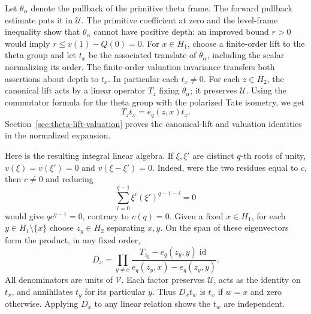 Let \(\theta_\alpha\) denote the pullback of the primitive theta
frame. The forward pullback estimate puts it in \(\mathcal U\).
The primitive coefficient at zero and the level-frame inequality
show that \(\theta_\alpha\) cannot have positive depth: an improved
bound \(r>0\) would imply \(r\le v(1)-Q(0)=0\).
For \(x\in H_1\), choose a finite-order lift to the theta group
and let \(t_x\) be the associated translate of \(\theta_\alpha\),
including the scalar normalizing its order. The finite-order
valuation invariance transfers both assertions about depth to \(t_x\).
In particular each \(t_x\ne0\). For each \(z\in H_2\), the canonical
lift acts by a linear operator \(T_z\) fixing \(\theta_\alpha\);
it preserves \(\mathcal U\).
Using the commutator formula for the theta group with the polarized
Tate isometry, we get
\[
                    T_z t_x=e_q(z,x)t_x .
\]
Section~\ref{sec:theta-lift-valuation} proves the canonical-lift and
valuation identities in the normalized expansion.

Here is the resulting integral linear algebra. If \(\xi,\xi'\) are
distinct \(q\)-th roots of unity, \(v(\xi)=v(\xi')=0\) and
\(v(\xi-\xi')=0\). Indeed, were the two residues equal to \(c\), then
\(c\ne0\) and reducing
\[
          \sum_{i=0}^{q-1}\xi^i(\xi')^{q-1-i}=0
\]
would give \(qc^{q-1}=0\), contrary to \(v(q)=0\).
Given a fixed \(x\in H_1\), for each \(y\in H_1\setminus\{x\}\)
choose \(z_y\in H_2\) separating \(x,y\). On the span of these
eigenvectors form the product, in any fixed order,
\[
   D_x=\prod_{y\ne x}
   \frac{T_{z_y}-e_q(z_y,y)\operatorname{id}}
        {e_q(z_y,x)-e_q(z_y,y)} .
\]
All denominators are units of \(\mathcal V\). Each factor preserves
\(\mathcal U\), acts as the identity on \(t_x\), and annihilates
\(t_y\) for its particular \(y\). Thus \(D_x t_w\) is \(t_x\)
if \(w=x\) and zero otherwise. Applying \(D_x\) to any linear
relation shows the \(t_w\) are independent.

